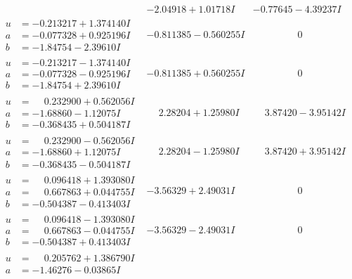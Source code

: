 \documentclass[1p]{elsarticle_modified}
\theoremstyle{definition}
\begin{document}
$$\begin{array}{c|c|c}
 & -2.04918 + 1.01718 I & -0.77645 - 4.39237 I \\ \hline\begin{aligned}
u &= -0.213217 + 1.374140 I \\
a &= -0.077328 + 0.925196 I \\
b &= -1.84754 - 2.39610 I\end{aligned}
 & -0.811385 - 0.560255 I & \phantom{-0.000000 } 0 \\ \hline\begin{aligned}
u &= -0.213217 - 1.374140 I \\
a &= -0.077328 - 0.925196 I \\
b &= -1.84754 + 2.39610 I\end{aligned}
 & -0.811385 + 0.560255 I & \phantom{-0.000000 } 0 \\ \hline\begin{aligned}
u &= \phantom{-}0.232900 + 0.562056 I \\
a &= -1.68860 - 1.12075 I \\
b &= -0.368435 + 0.504187 I\end{aligned}
 & \phantom{-}2.28204 + 1.25980 I & \phantom{-}3.87420 - 3.95142 I \\ \hline\begin{aligned}
u &= \phantom{-}0.232900 - 0.562056 I \\
a &= -1.68860 + 1.12075 I \\
b &= -0.368435 - 0.504187 I\end{aligned}
 & \phantom{-}2.28204 - 1.25980 I & \phantom{-}3.87420 + 3.95142 I \\ \hline\begin{aligned}
u &= \phantom{-}0.096418 + 1.393080 I \\
a &= \phantom{-}0.667863 + 0.044755 I \\
b &= -0.504387 - 0.413403 I\end{aligned}
 & -3.56329 + 2.49031 I & \phantom{-0.000000 } 0 \\ \hline\begin{aligned}
u &= \phantom{-}0.096418 - 1.393080 I \\
a &= \phantom{-}0.667863 - 0.044755 I \\
b &= -0.504387 + 0.413403 I\end{aligned}
 & -3.56329 - 2.49031 I & \phantom{-0.000000 } 0 \\ \hline\begin{aligned}
u &= \phantom{-}0.205762 + 1.386790 I \\
a &= -1.46276 - 0.03865 I \\

\end{aligned}
\end{array}$$
\end{document}
